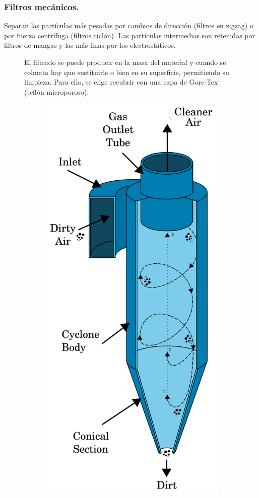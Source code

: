 \subsubsection{Filtros mecánicos.}
Separan las partículas más pesadas por cambios de dirección (filtros en zigzag) o por fuerza centrífuga (filtros ciclón). Las partículas intermedias son retenidas por filtros de mangas y las más finas por los electrostáticos.
\begin{figure}[H]
	\begin{minipage}{0.55\textwidth}
El filtrado se puede producir en la masa del material y cuando se colmata hay que sustituirle o bien en su superficie, permitiendo su limpieza. Para ello, se elige recubrir con una capa de Gore-Tex (teflón microporoso).	
\end{minipage}
\begin{minipage}{0.45\textwidth}
\begin{figure}[H]
	\centering
	\includegraphics[width=0.4\linewidth]{res/tema10/ciclo9n}

	\label{fig:ciclo9n}
\end{figure}
	\end{minipage}
\end{figure}



